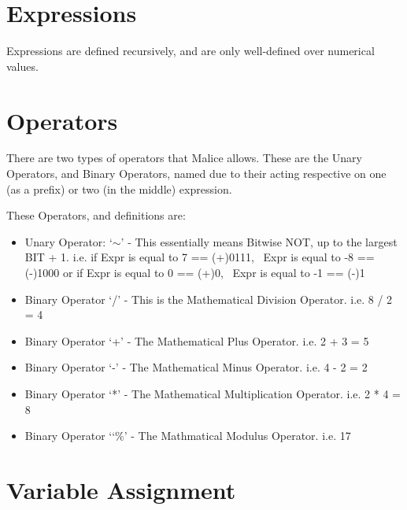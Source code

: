\documentclass[a4wide, 11pt]{article}
\begin{document}
\section{Expressions}

Expressions are defined recursively, and are only well-defined over numerical values.

\section{Operators}

There are two types of operators that Malice allows. These are the Unary Operators, and Binary Operators, named due to their acting respective on one (as a prefix) or two (in the middle) expression.

These Operators, and definitions are:

\begin{itemize}

\item
Unary Operator: `$\sim$' - This essentially means Bitwise NOT, up to the largest BIT + 1.
i.e. \vspace{0.75mm} \hspace{25mm} \hspace{12mm} if Expr is equal to 7 == (+)0111, ~Expr is equal to -8 == (-)1000
or \vspace{0.75mm} \hspace{25mm} \hspace{13mm} if Expr is equal to  0 == (+)0, ~Expr is equal to -1 == (-)1
\item
Binary Operator `/' \hspace{2mm}- This is the Mathematical Division Operator. i.e. 8 / 2 = 4
\item
Binary Operator `+' \hspace{1mm}- The Mathematical Plus Operator. i.e. 2 + 3 = 5
\item 
Binary Operator `-'\hspace{3mm} - The Mathematical Minus Operator. i.e. 4 - 2 = 2
\item
Binary Operator `*'\hspace{2.5mm} - The Mathematical Multiplication Operator. i.e. 2 * 4 = 8
\item
Binary Operator `\char`\%'\hspace{1mm} - The Mathmatical Modulus Operator. i.e.  17 %

\end{itemize}


\section{Variable Assignment}
\end{document}
